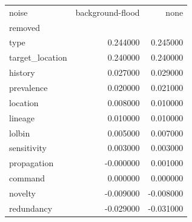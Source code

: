 \begin{tabular}{lrr}
\toprule
noise & background-flood & none \\
removed &  &  \\
\midrule
type & 0.244000 & 0.245000 \\
target_location & 0.240000 & 0.240000 \\
history & 0.027000 & 0.029000 \\
prevalence & 0.020000 & 0.021000 \\
location & 0.008000 & 0.010000 \\
lineage & 0.010000 & 0.010000 \\
lolbin & 0.005000 & 0.007000 \\
sensitivity & 0.003000 & 0.003000 \\
propagation & -0.000000 & 0.001000 \\
command & 0.000000 & 0.000000 \\
novelty & -0.009000 & -0.008000 \\
redundancy & -0.029000 & -0.031000 \\
\bottomrule
\end{tabular}
